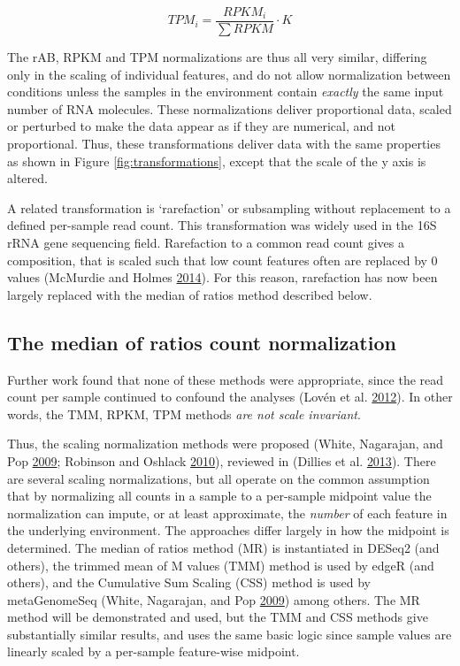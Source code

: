 \documentclass[onecolumn]{book}
\theoremstyle{definition}
\theoremstyle{definition}
\theoremstyle{definition}
\theoremstyle{remark}
\begin{document}
\begin{equation}
    TPM_{i} = \frac{RPKM_i}{\sum{RPKM}} \cdot K
    \label{eq:tpm}
\end{equation}

The rAB, RPKM and TPM normalizations are thus all very similar,
differing only in the scaling of individual features, and do not allow
normalization between conditions unless the samples in the environment
contain \emph{exactly} the same input number of RNA molecules. These
normalizations deliver proportional data, scaled or perturbed to make
the data appear as if they are numerical, and not proportional. Thus,
these transformations deliver data with the same properties as shown in
Figure \ref{fig:transformations}, except that the scale of the y axis is
altered.

A related transformation is `rarefaction' or subsampling without
replacement to a defined per-sample read count. This transformation was
widely used in the 16S rRNA gene sequencing field. Rarefaction to a
common read count gives a composition, that is scaled such that low
count features often are replaced by 0 values (McMurdie and Holmes
\protect\hyperlink{ref-McMurdie:2014a}{2014}). For this reason,
rarefaction has now been largely replaced with the median of ratios
method described below.

\hypertarget{the-median-of-ratios-count-normalization}{%
\subsection{The median of ratios count
normalization}\label{the-median-of-ratios-count-normalization}}

Further work found that none of these methods were appropriate, since
the read count per sample continued to confound the analyses (Lovén et
al. \protect\hyperlink{ref-Loven:2012aa}{2012}). In other words, the
TMM, RPKM, TPM methods \emph{are not scale invariant}.

Thus, the scaling normalization methods were proposed (White, Nagarajan,
and Pop \protect\hyperlink{ref-White:2009}{2009}; Robinson and Oshlack
\protect\hyperlink{ref-Robinson:2010a}{2010}), reviewed in (Dillies et
al. \protect\hyperlink{ref-Dillies:2013}{2013}). There are several
scaling normalizations, but all operate on the common assumption that by
normalizing all counts in a sample to a per-sample midpoint value the
normalization can impute, or at least approximate, the \emph{number} of
each feature in the underlying environment. The approaches differ
largely in how the midpoint is determined. The median of ratios method
(MR) is instantiated in DESeq2 (and others), the trimmed mean of M
values (TMM) method is used by edgeR (and others), and the Cumulative
Sum Scaling (CSS) method is used by metaGenomeSeq (White, Nagarajan, and
Pop \protect\hyperlink{ref-White:2009}{2009}) among others. The MR
method will be demonstrated and used, but the TMM and CSS methods give
substantially similar results, and uses the same basic logic since
sample values are linearly scaled by a per-sample feature-wise midpoint.
\end{document}
